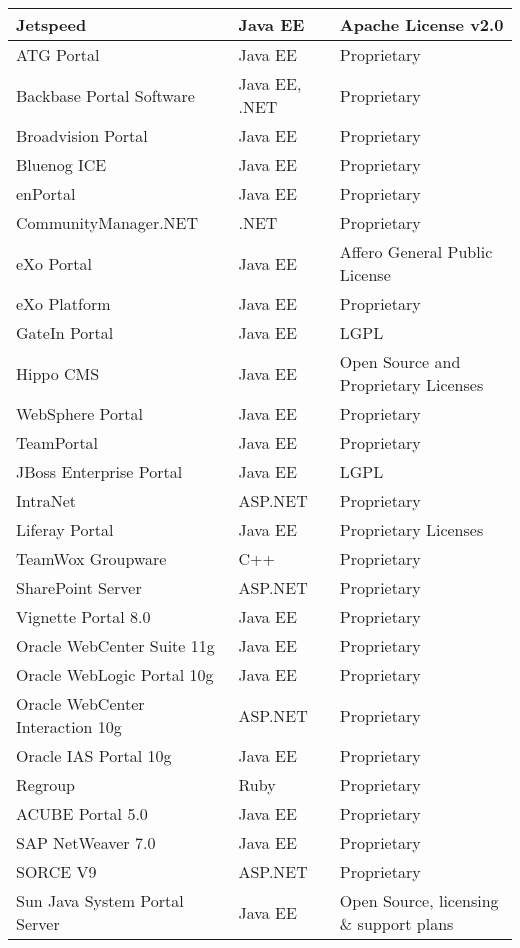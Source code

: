 \begin{center}
\begin{longtable}{|
p{}|
p{}|
p{}|}
Jetspeed & Java EE & Apache License v2.0\\ \hline
 ATG Portal & Java EE & Proprietary\\ \hline
 Backbase Portal Software & Java EE, .NET & Proprietary \\ \hline 
 Broadvision Portal & Java EE & Proprietary \\ \hline 
 Bluenog ICE & Java EE & Proprietary \\ \hline
 enPortal  & Java EE & Proprietary\\ \hline 
 CommunityManager.NET  & .NET & Proprietary \\ \hline
 eXo Portal & Java EE & Affero General Public License \\ \hline
 eXo Platform & Java EE & Proprietary \\ \hline
 GateIn Portal & Java EE & LGPL \\ \hline
 Hippo CMS & Java EE & Open Source and Proprietary Licenses \\ \hline
 WebSphere Portal & Java EE & Proprietary \\ \hline
 TeamPortal & Java EE & Proprietary \\ \hline
 JBoss Enterprise Portal  & Java EE & LGPL \\ \hline
 IntraNet & ASP.NET & Proprietary \\ \hline
 Liferay Portal & Java EE & Proprietary Licenses \\ \hline
 TeamWox Groupware & C++ & Proprietary \\ \hline
 SharePoint Server & ASP.NET & Proprietary \\ \hline
 Vignette Portal 8.0 & Java EE & Proprietary \\ \hline
 Oracle WebCenter Suite 11g & Java EE & Proprietary \\ \hline
 Oracle WebLogic Portal 10g & Java EE & Proprietary \\ \hline
 Oracle WebCenter Interaction 10g & ASP.NET & Proprietary \\ \hline
 Oracle IAS Portal 10g & Java EE & Proprietary \\ \hline
 Regroup & Ruby & Proprietary \\ \hline
 ACUBE Portal 5.0 & Java EE & Proprietary \\ \hline
 SAP NetWeaver 7.0 & Java EE & Proprietary \\ \hline
 SORCE V9 & ASP.NET & Proprietary \\ \hline
 Sun Java System Portal Server & Java EE & Open Source, licensing \& support plans \\ \hline

\end{longtable}
\end{center}

